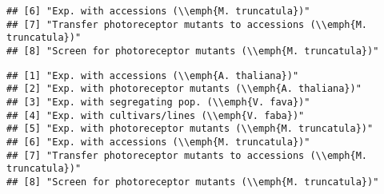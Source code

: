 \begin{knitrout}
\begin{kframe}
\begin{verbatim}
## [6] "Exp. with accessions (\\emph{M. truncatula})"                        
## [7] "Transfer photoreceptor mutants to accessions (\\emph{M. truncatula})"
## [8] "Screen for photoreceptor mutants (\\emph{M. truncatula})"
\end{verbatim}
\begin{alltt}
 \hlkwb{<-} \hlstd{(}
          
    \hlstd{=} \hlstd{(}\hlstd{,} \hlstd{,} \hlstd{,} \hlstd{,} \hlstd{,} \hlstd{,} \hlstd{,} \hlstd{),}
      \hlstd{=} \hlstd{(}\hlstd{,} \hlstd{,} \hlstd{,} \hlstd{,} \hlstd{,} \hlstd{,} \hlstd{,} \hlstd{),}
      \hlstd{=} \hlstd{(}\hlstd{,} \hlstd{,} \hlstd{,} \hlstd{,} \hlstd{,} \hlstd{,} \hlstd{,} \hlstd{),}
       \hlstd{=} \hlstd{(}\hlstd{,} \hlstd{,} \hlstd{,} \hlstd{,} \hlstd{,} \hlstd{,} \hlstd{,} \hlstd{)}
\hlstd{)}
\hlopt{$}
\end{alltt}
\begin{verbatim}
## [1] "Exp. with accessions (\\emph{A. thaliana})"                          
## [2] "Exp. with photoreceptor mutants (\\emph{A. thaliana})"               
## [3] "Exp. with segregating pop. (\\emph{V. fava})"                        
## [4] "Exp. with cultivars/lines (\\emph{V. faba})"                         
## [5] "Exp. with photoreceptor mutants (\\emph{M. truncatula})"             
## [6] "Exp. with accessions (\\emph{M. truncatula})"                        
## [7] "Transfer photoreceptor mutants to accessions (\\emph{M. truncatula})"
## [8] "Screen for photoreceptor mutants (\\emph{M. truncatula})"
\end{verbatim}
\begin{alltt}
 \hlkwb{<-} 


\end{alltt}
\end{kframe}
\end{knitrout}

